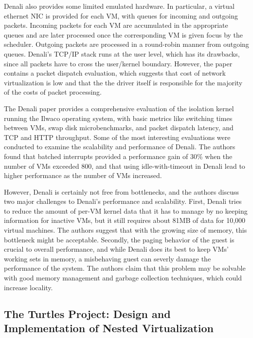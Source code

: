 \documentclass[letterpaper, twocolumn]{article}
\begin{document}
Denali also provides some limited emulated hardware.  In particular, a virtual ethernet NIC is 
provided for each VM, with queues for incoming and outgoing packets.
Incoming packets for each VM are accumulated in the appropriate queues and are later processed once the
corresponding VM is given focus by the scheduler.  Outgoing packets are processed in a
round-robin manner from outgoing queues. Denali's TCP/IP stack runs at the user level, which
has its drawbacks, since all packets have to cross the user/kernel boundary. However, the paper contains
a packet dispatch evaluation, which suggests that cost of network virtualization is low and that the the
driver itself is responsible for the majority of the costs of packet processing.

The Denali paper provides a comprehensive evaluation of the isolation kernel running
the Ilwaco operating system, with basic metrics like switching times between VMs, swap disk
microbenchmarks, and packet dispatch latency, and TCP and HTTP throughput. Some of the most
interesting evaluations were conducted to examine the scalability and performance of Denali.
The authors found that batched interrupts provided a performance gain of 30\% when the number
of VMs exceeded 800, and that using idle-with-timeout in Denali lead to higher performance as
the number of VMs increased.

However, Denali is certainly not free from bottlenecks, and the authors discuss two major challenges to
Denali's performance and scalability. First, Denali tries to reduce the amount of per-VM kernel data
that it has to manage by no keeping information for inactive VMs, but it still requires about 81MB
of data for 10,000 virtual machines. The authors suggest that with the growing size of memory,
this bottleneck might be acceptable. Secondly, the paging behavior of the guest is crucial to overall performance,
and while Denali does its best to keep VMs' working sets in memory, a misbehaving guest can severly damage the
performance of the system.  The authors claim that this problem may be solvable with good memory management 
and garbage collection techniques, which could increase locality.

\subsection{The Turtles Project: Design and Implementation of Nested Virtualization}
\label{sec:summaries/turtles}
\end{document}
